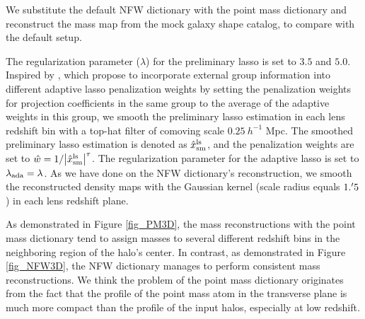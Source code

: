 
We substitute the default NFW dictionary with the point mass dictionary and
reconstruct the mass map from the mock galaxy shape catalog, to compare with
the default setup.

The regularization parameter ($\lambda$) for the preliminary lasso is set to
$3.5$ and $5.0$.  Inspired by \citet{structureAdaLasso-Pramanik2020}, which
propose to incorporate external group information into different adaptive lasso
penalization weights by setting the penalization weights for projection
coefficients in the same group to the average of the adaptive weights in this
group, we smooth the preliminary lasso estimation in each lens redshift bin
with a top-hat filter of comoving scale $0.25~h^{-1}$ Mpc. The smoothed
preliminary lasso estimation is denoted as $\hat{x}^{\rm{ls}}_{\rm{sm}}$, and
the penalization weights are set to
$\hat{w}=1/\abs{\hat{x}^{\rm{ls}}_{\rm{sm}}}^\tau$.
The regularization parameter for the adaptive lasso is set to
$\lambda_{\rm{ada}}=\lambda$.
As we have done on the NFW dictionary's reconstruction, we smooth the
reconstructed density maps with the Gaussian kernel (scale radius equals
$1.\mbox{$^\prime$} 5$) in each lens redshift plane.

As demonstrated in Figure \ref{fig_PM3D}, the mass reconstructions with the
point mass dictionary tend to assign masses to several different redshift bins
in the neighboring region of the halo's center.  In contrast, as demonstrated in
Figure \ref{fig_NFW3D}, the NFW dictionary manages to perform consistent mass
reconstructions.  We think the problem of the point mass dictionary originates
from the fact that the profile of the point mass atom in the transverse plane
is much more compact than the profile of the input halos, especially at low
redshift.

\begin{figure*}
\centering
{}
\caption{The density maps reconstructed from the mock galaxy shape catalog with
    the point mass dictionary. The penalization parameters are $\lambda=3.5$
    (left) and $\lambda=5.0$ (right).  The input halo mass is
    $M_{200}=10^{15.02} ~h^{-1}M_{\odot}$, and its redshift is $z=0.164$.  The
    vertical direction is the line of sight direction. The boxes' lower
    boundaries and upper boundaries of correspond to $z=0.01$ and $z=0.85$,
    respectively.
    } \label{fig_PM3D}
\end{figure*}
